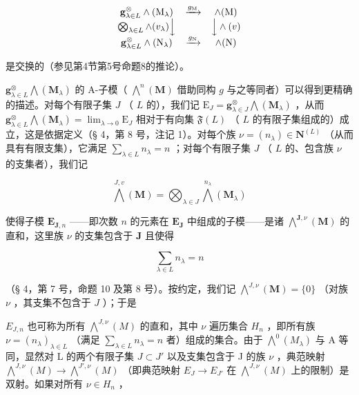 \[
\begin{array}{c c c} \mathbf {g} _ {\lambda \in L} ^ {\otimes} \wedge (\mathrm{M} _ {\lambda}) & \xrightarrow {g _ {\mathrm{M}}} & \wedge (\mathrm{M}) \\ \bigotimes_ {\lambda \in L} \wedge (v _ {\lambda}) \Big \downarrow & & \Big \downarrow \wedge (v) \\ \mathbf {g} _ {\lambda \in L} ^ {\otimes} \wedge (\mathrm{N} _ {\lambda}) & \xrightarrow {g _ {\mathrm{N}}} & \wedge (\mathrm{N}) \end{array}
\]

是交换的（参见第4节第5号命题8的推论）。

\(\mathbf{g}_{\lambda \in L}^{\otimes} \bigwedge (\mathbf{M}_{\lambda})\) 的 A-子模（ \(\bigwedge^{n}(\mathbf{M})\) 借助同构 \(g\) 与之等同者）可以得到更精确的描述。对每个有限子集 \(J\) （ \(L\) 的），我们记 \(\mathrm{E}_{J} = \mathbf{g}_{\lambda \in J}^{\otimes} \bigwedge (\mathbf{M}_{\lambda})\) ，从而 \(\mathbf{g}_{\lambda \in L}^{\otimes} \bigwedge (\mathbf{M}_{\lambda}) = \lim_{\lambda \to 0} \mathrm{E}_{J}\) 相对于有向集 \(\mathfrak{F}(L)\) （ \(L\) 的有限子集组成的）成立，这是依据定义（§ 4，第 8 号，注记 1）。对每个族 \(\nu = (n_{\lambda}) \in \mathbf{N}^{(L)}\) （从而具有有限支集），它满足 \(\sum_{\lambda \in L} n_{\lambda} = n\) ；对每个有限子集 \(J\) （ \(L\) 的、包含族 \(\nu\) 的支集者），我们记

\[
\bigwedge^ {J, v} (\mathbf {M}) = \bigotimes_ {\lambda \in J} \bigwedge^ {n _ {\lambda}} (\mathbf {M} _ {\lambda})\tag{16}
\]

使得子模 \(\mathbf{E}_{\mathbf{J},n}\) ——即次数 \(n\) 的元素在 \(\mathbf{E}_{\mathbf{J}}\) 中组成的子模——是诸 \(\bigwedge^{\mathbf{J},\nu}(\mathbf{M})\) 的直和，这里族 \(\nu\) 的支集包含于 \(\mathbf{J}\) 且使得

\[
\sum_ {\lambda \in L} n _ {\lambda} = n
\]

（§ 4，第 7 号，命题 10 及第 8 号）。按约定，我们记 \(\bigwedge^{J,\nu}(\mathbf{M}) = \{0\}\) （对族 \(\nu\) ，其支集不包含于 \(J\) ）；于是

\(E_{J,n}\) 也可称为所有 \(\bigwedge^{J,\nu}(M)\) 的直和，其中 \(\nu\) 遍历集合 \(H_n\) ，即所有族 \(\nu = (n_\lambda)_{\lambda \in L}\) （满足 \(\sum_{\lambda \in L} n_\lambda = n\) 者）组成的集合。由于 \(\bigwedge^0(M_\lambda)\) 与 A 等同，显然对 L 的两个有限子集 \(J \subset J'\) 以及支集包含于 J 的族 \(\nu\) ，典范映射 \(\bigwedge^{J,\nu}(M) \to \bigwedge^{J',\nu}(M)\) （即典范映射 \(E_J \to E_{J'}\) 在 \(\bigwedge^{J,\nu}(M)\) 上的限制）是双射。如果对所有 \(\nu \in H_n\) ，

